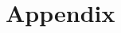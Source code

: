 \documentclass[runningheads, a4paper]{llncs}
\begin{document}
\section{Appendix}

\begin{thebibliography}{4}


\end{thebibliography}
\end{document}
